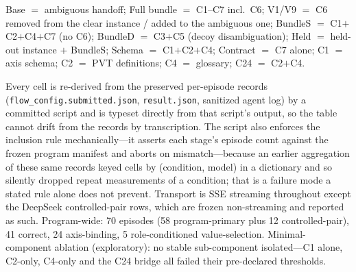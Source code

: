\documentclass{article}
\begin{document}
\begin{table}[h]
\centering\footnotesize
\caption{\textbf{Study I episode ledger}, one row per (stage, condition, model): typed-binding correct$/k$, then the two failure subtypes. \emph{Inclusion rule:} the 58 program-primary episodes declared by the frozen ablation-phase manifests---omitting only what those manifests mark excluded, invalid or aborted (3, 0 and 1)---plus the 12 earlier controlled-pair episodes, giving 70; this descriptive ledger is deliberately broader than the 58-episode program-primary accounting of the reproducibility statement. A condition measured in two run windows occupies two rows and is never deduplicated, which is why Base(0009)/DeepSeek appears three times and C24 twice.}
\label{tab:ledger}


\vspace{2pt}
{\scriptsize Base $=$ ambiguous handoff; Full bundle $=$ C1--C7 incl.\ C6; V1/V9 $=$ C6 removed from the clear instance / added to the ambiguous one; BundleS $=$ C1$+$C2$+$C4$+$C7 (no C6); BundleD $=$ C3$+$C5 (decoy disambiguation); Held $=$ held-out instance $+$ BundleS; Schema $=$ C1$+$C2$+$C4; Contract $=$ C7 alone; C1 $=$ axis schema; C2 $=$ PVT definitions; C4 $=$ glossary; C24 $=$ C2$+$C4.}
\end{table}

Every cell is re-derived from the preserved per-episode records (\texttt{flow\_config.submitted.json}, \texttt{result.json}, sanitized agent log) by a committed script and is typeset directly from that script's output, so the table cannot drift from the records by transcription. The script also enforces the inclusion rule mechanically---it asserts each stage's episode count against the frozen program manifest and aborts on mismatch---because an earlier aggregation of these same records keyed cells by (condition, model) in a dictionary and so silently dropped repeat measurements of a condition; that is a failure mode a stated rule alone does not prevent. Transport is SSE streaming throughout except the DeepSeek controlled-pair rows, which are frozen non-streaming and reported as such. Program-wide: 70 episodes (58 program-primary plus 12 controlled-pair), 41 correct, 24 axis-binding, 5 role-conditioned value-selection. Minimal-component ablation (exploratory): no stable sub-component isolated---C1 alone, C2-only, C4-only and the C24 bridge all failed their pre-declared thresholds.
\end{document}
